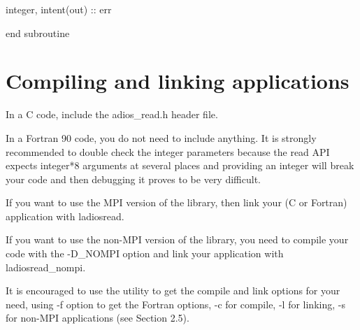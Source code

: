 integer,        intent(out) :: err 

\parindent=0pt
end subroutine\label{HToc182553414}

\section{Compiling and linking applications}

In a C code, include the adios\_read.h header file. 

In a Fortran 90 code, you do not need to include anything. It is strongly recommended 
to double check the integer parameters because the read API expects integer*8 arguments 
at several places and providing an integer will break your code and then debugging 
it proves to be very difficult.

If you want to use the MPI version of the library, then link your (C or Fortran) 
application with \-{}ladiosread.

If you want to use the non-MPI version of the library, you need to compile your 
code with the -D\_NOMPI option and link your application with \-{}ladiosread\_nompi.

It is encouraged to use the utility to get the compile and link options for your 
need, using -f option to get the Fortran options, -c for compile, -l for linking, 
-s for non-MPI applications (see Section 2.5). \label{HToc182553415}
